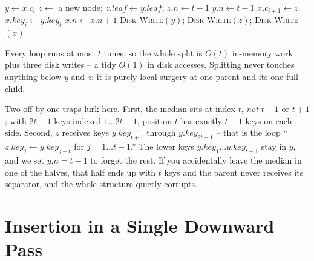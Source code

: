 \begin{algorithm}[H]
\caption{\textsc{B-Tree-Split-Child}$(x, i)$ -- split the full child $x.c_i$}
$y \gets x.c_i$
$z \gets$ a new node; \quad $z.\mathit{leaf} \gets y.\mathit{leaf}$; \quad $z.n \gets t-1$\;
$y.n \gets t-1$
$x.c_{i+1} \gets z$\;
$x.\mathit{key}_i \gets y.\mathit{key}_t$
$x.n \gets x.n + 1$\;
\textsc{Disk-Write}$(y)$; \textsc{Disk-Write}$(z)$; \textsc{Disk-Write}$(x)$\;
\end{algorithm}

Every loop runs at most $t$ times, so the whole split is $O(t)$ in-memory work plus
three disk writes -- a tidy $O(1)$ in disk accesses. Splitting never
touches anything below $y$ and $z$; it is purely local surgery at one parent and
its one full child.

\begin{trapbox}
Two off-by-one traps lurk here. First, the median sits at index $t$, \emph{not}
$t-1$ or $t+1$; with $2t-1$ keys indexed $1\ldots 2t-1$, position $t$ has exactly
$t-1$ keys on each side. Second, $z$ receives keys $y.\mathit{key}_{t+1}$ through
$y.\mathit{key}_{2t-1}$ -- that is the loop ``$z.\mathit{key}_j \gets
y.\mathit{key}_{j+t}$ for $j=1\ldots t-1$.'' The lower keys
$y.\mathit{key}_1\ldots y.\mathit{key}_{t-1}$ stay in $y$, and we set
$y.n = t-1$ to forget the rest. If you accidentally leave the median in one of the
halves, that half ends up with $t$ keys and the parent never receives its
separator, and the whole structure quietly corrupts.
\end{trapbox}

\section{Insertion in a Single Downward Pass}

